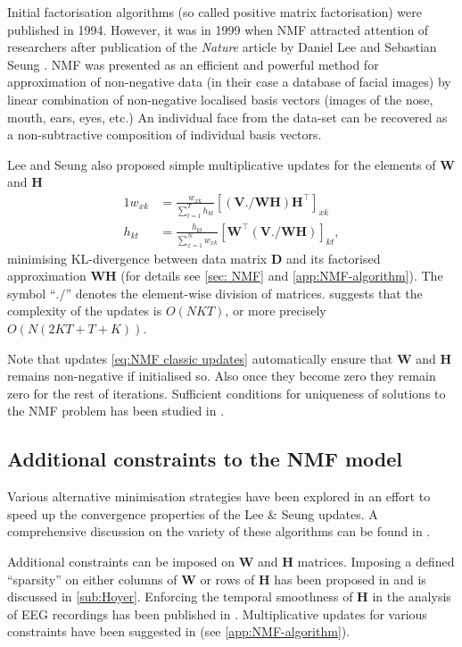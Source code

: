 Initial factorisation algorithms (so called positive matrix factorisation) \cite{Paatero1994} were published in 1994. However, it was in 1999 when NMF attracted attention of researchers after publication of the \emph{Nature} article by Daniel Lee and Sebastian Seung \cite{Lee1999}. NMF was presented as an efficient and powerful method for approximation of non-negative data (in their case a database of facial images) by linear combination of non-negative localised basis vectors (images of the nose, mouth, ears, eyes, etc.) An individual face from the data-set can be recovered as a non-subtractive composition of individual basis vectors. 

Lee and Seung also proposed simple multiplicative updates \cite{Lee2001} for the elements of $\bm{W}$ and $\bm{H}$
%
\begin{alignat}{1}
	w_{xk} & =\frac{w_{xk}}{\sum_{t=1}^{T}h_{kt}}\left[(\bm{V}./\bm{WH})\bm{H^{\top}}\right]_{xk}\nonumber \\
	h_{kt} & =\frac{h_{kt}}{\sum_{x=1}^{N}w_{xk}}\left[\bm{W^{\top}}(\bm{V}./\bm{WH})\right]_{kt},
	\label{eq:NMF classic updates}
\end{alignat}
%
minimising KL-divergence between data matrix $\bm{D}$ and its factorised approximation $\bm{WH}$ (for details see \autoref{sec: NMF} and \autoref{app:NMF-algorithm}). The symbol ``$./$'' denotes the element-wise division of matrices.  suggests that the complexity of the updates is $O\left(NKT\right)$, or more precisely $O\left(N(2KT+T+K)\right)$.

Note that updates \autoref{eq:NMF classic updates} automatically ensure that $\bm{W}$ and $\bm{H}$ remains non-negative if initialised so. Also once they become zero they remain zero for the rest of iterations. Sufficient conditions for uniqueness of solutions to the NMF problem has been studied in \cite{Donoho2004}. 


\subsection{Additional constraints to the NMF model \label{sub:NMF constrains}}
Various alternative minimisation strategies have been explored in an effort to speed up the convergence properties of the Lee \& Seung updates. A comprehensive discussion on the variety of these algorithms can be found in \cite{Berry2007}. 

Additional constraints can be imposed on $\bm{W}$ and $\bm{H}$ matrices. Imposing a defined ``sparsity'' on either columns of $\bm{W}$ or rows of $\bm{H}$ has been proposed in \cite{Hoyer2004} and is discussed in \autoref{sub:Hoyer}. Enforcing the temporal smoothness of $\bm{H}$ in the analysis of EEG recordings has been published in \cite{Chen2005}. Multiplicative updates for various constraints have been suggested in \cite{Chen2005,Pauca2006}  (see \autoref{app:NMF-algorithm}).

